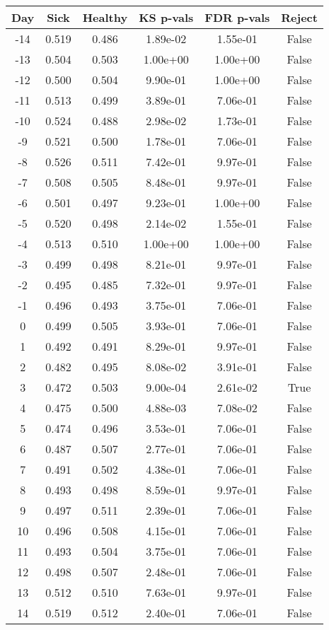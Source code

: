 \begin{tabular}{c|c|c|c|c|c}
Day &  Sick & Healthy &  KS p-vals & FDR p-vals & Reject\\
\hline
-14 & 0.519 &   0.486 &   1.89e-02 &   1.55e-01 &  False\\
-13 & 0.504 &   0.503 &   1.00e+00 &   1.00e+00 &  False\\
-12 & 0.500 &   0.504 &   9.90e-01 &   1.00e+00 &  False\\
-11 & 0.513 &   0.499 &   3.89e-01 &   7.06e-01 &  False\\
-10 & 0.524 &   0.488 &   2.98e-02 &   1.73e-01 &  False\\
 -9 & 0.521 &   0.500 &   1.78e-01 &   7.06e-01 &  False\\
 -8 & 0.526 &   0.511 &   7.42e-01 &   9.97e-01 &  False\\
 -7 & 0.508 &   0.505 &   8.48e-01 &   9.97e-01 &  False\\
 -6 & 0.501 &   0.497 &   9.23e-01 &   1.00e+00 &  False\\
 -5 & 0.520 &   0.498 &   2.14e-02 &   1.55e-01 &  False\\
 -4 & 0.513 &   0.510 &   1.00e+00 &   1.00e+00 &  False\\
 -3 & 0.499 &   0.498 &   8.21e-01 &   9.97e-01 &  False\\
 -2 & 0.495 &   0.485 &   7.32e-01 &   9.97e-01 &  False\\
 -1 & 0.496 &   0.493 &   3.75e-01 &   7.06e-01 &  False\\
  0 & 0.499 &   0.505 &   3.93e-01 &   7.06e-01 &  False\\
  1 & 0.492 &   0.491 &   8.29e-01 &   9.97e-01 &  False\\
  2 & 0.482 &   0.495 &   8.08e-02 &   3.91e-01 &  False\\
  3 & 0.472 &   0.503 &   9.00e-04 &   2.61e-02 &   True\\
  4 & 0.475 &   0.500 &   4.88e-03 &   7.08e-02 &  False\\
  5 & 0.474 &   0.496 &   3.53e-01 &   7.06e-01 &  False\\
  6 & 0.487 &   0.507 &   2.77e-01 &   7.06e-01 &  False\\
  7 & 0.491 &   0.502 &   4.38e-01 &   7.06e-01 &  False\\
  8 & 0.493 &   0.498 &   8.59e-01 &   9.97e-01 &  False\\
  9 & 0.497 &   0.511 &   2.39e-01 &   7.06e-01 &  False\\
 10 & 0.496 &   0.508 &   4.15e-01 &   7.06e-01 &  False\\
 11 & 0.493 &   0.504 &   3.75e-01 &   7.06e-01 &  False\\
 12 & 0.498 &   0.507 &   2.48e-01 &   7.06e-01 &  False\\
 13 & 0.512 &   0.510 &   7.63e-01 &   9.97e-01 &  False\\
 14 & 0.519 &   0.512 &   2.40e-01 &   7.06e-01 &  False\\
\end{tabular}